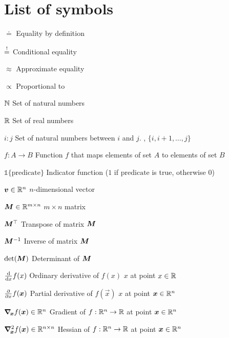 \section*{List of symbols}

\vspace{10mm}

\begin{abbrv}
    \item[$\doteq$] Equality by definition
    \item[$\condeq$] Conditional equality
    \item[$\approx$] Approximate equality
    \item[$\propto$] Proportional to
    \item[$\N$] Set of natural numbers
    \item[$\R$] Set of real numbers
    \item[$i:j$] Set of natural numbers between $i$ and $j$. \Ie, $\{i, i+1,\ldots,j\}$
    \item[$f: A \to B$] Function $f$ that maps elements of set $A$ to elements of set $B$
    \item[$\mathbb{1}\{\mathrm{predicate}\}$] Indicator function ($1$ if $\mathrm{predicate}$ is true, otherwise $0$)

    \item

    \item[$\vec{v} \in \R^n$] $n$-dimensional vector
    \item[$\mat{M} \in \R^{m\times n}$] $m \times n$ matrix
    \item[$\transpose{\mat{M}}$] Transpose of matrix $\mat{M}$
    \item[$\inv{\mat{M}}$] Inverse of matrix $\mat{M}$
    \item[$\det{\mat{M}}$] Determinant of $\mat{M}$

    \item

    \item[$\odv*{f(x)}{x}$] Ordinary derivative of $f(x)$ \wrt $x$ at point $x\in\R$
    \item[$\pdv*{f(\vec{x})}{x}$] Partial derivative of $f(\vec{x})$ \wrt $x$ at point $\vec{x}\in\R^n$
    \item[$\grad{f(\vec{x})}{\vec{x}} \in \R^n$] Gradient of $f: \R^n \to \R$ at point $\vec{x}\in\R^n$
    \item[$\hess{f(\vec{x})}{\vec{x}} \in \R^{n\times n}$] Hessian of $f: \R^n \to \R$ at point $\vec{x}\in\R^n$
\end{abbrv}
